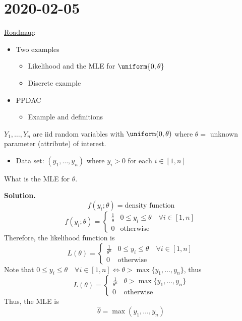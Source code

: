 \section{2020-02-05}
\underline{Roadmap}:
\begin{itemize}
    \item Two examples
          \begin{itemize}
              \item Likelihood and the MLE for $ \uniform{0,\theta} $
              \item Discrete example
          \end{itemize}
    \item PPDAC
          \begin{itemize}
              \item Example and definitions
          \end{itemize}
\end{itemize}

\begin{Example}{}{}
    $ Y_1,\ldots ,Y_n $ are iid random variables with $ \uniform(0,\theta) $
    where $ \theta= $ unknown parameter (attribute) of interest.
    \begin{itemize}
        \item Data set: $ (y_1,\ldots ,y_n) $ where $ y_i>0 $ for each $ i\in[1,n] $
    \end{itemize}
    What is the MLE for $ \theta $.

    \textbf{Solution.}
    \[ f(y_i;\theta)=\text{density function} \]
    \[ f(y_i;\theta)=
        \begin{cases}
            \frac{1}{\theta} & 0\leqslant y_i \leqslant \theta\quad\forall i\in[1,n] \\
            0                & \text{otherwise}
        \end{cases} \]
    Therefore, the likelihood function is
    \[ L(\theta)=
        \begin{cases}
            \frac{1}{\theta^n} & 0\leqslant y_i\leqslant \theta\quad\forall i\in[1,n] \\
            0                  & \text{otherwise}
        \end{cases} \]
    Note that $ 0\leqslant y_i\leqslant \theta\quad\forall i\in[1,n]\iff
        \theta>\max\{y_1,\ldots ,y_n\} $, thus
    \[ L(\theta)=
        \begin{cases}
            \frac{1}{\theta^n} & \theta>\max \{y_1,\ldots ,y_n\} \\
            0                  & \text{otherwise}
        \end{cases} \]
    Thus, the MLE is
    \[ \hat{\theta}=\max(y_1,\ldots ,y_n) \]
\end{Example}



